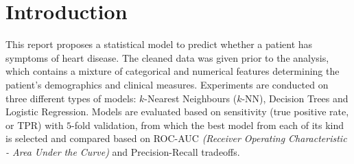 \section{Introduction}


This report proposes a statistical model to predict whether a patient has symptoms of heart disease. The cleaned data was given prior to the analysis, which contains a mixture of categorical and numerical features determining the patient's demographics and clinical measures. Experiments are conducted on three different types of models: $k$-Nearest Neighbours ($k$-NN), Decision Trees and Logistic Regression. Models are evaluated based on sensitivity (true positive rate, or TPR) with \( 5 \)-fold validation, from which the best model from each of its kind is selected and compared based on ROC-AUC \textit{(Receiver Operating Characteristic - Area Under the Curve)} and Precision-Recall tradeoffs.